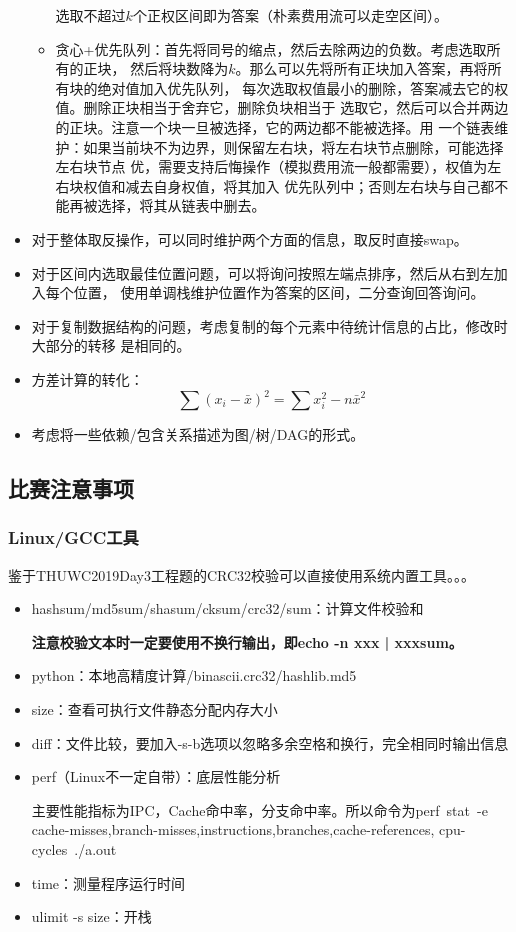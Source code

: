 \begin{itemize}
\begin{itemize}
		选取不超过$k$个正权区间即为答案（朴素费用流可以走空区间）。
		\item 贪心+优先队列：首先将同号的缩点，然后去除两边的负数。考虑选取所有的正块，
		然后将块数降为$k$。那么可以先将所有正块加入答案，再将所有块的绝对值加入优先队列，
		每次选取权值最小的删除，答案减去它的权值。删除正块相当于舍弃它，删除负块相当于
		选取它，然后可以合并两边的正块。注意一个块一旦被选择，它的两边都不能被选择。用
		一个链表维护：如果当前块不为边界，则保留左右块，将左右块节点删除，可能选择左右块节点
		优，需要支持后悔操作（模拟费用流一般都需要），权值为左右块权值和减去自身权值，将其加入
		优先队列中；否则左右块与自己都不能再被选择，将其从链表中删去。
	\end{itemize}
	\item 对于整体取反操作，可以同时维护两个方面的信息，取反时直接swap。
	\item 对于区间内选取最佳位置问题，可以将询问按照左端点排序，然后从右到左加入每个位置，
	使用单调栈维护位置作为答案的区间，二分查询回答询问。
	\item 对于复制数据结构的问题，考虑复制的每个元素中待统计信息的占比，修改时大部分的转移
	是相同的。
	\item 方差计算的转化：\begin{displaymath}
		\sum{(x_i-\bar{x})^2}=\sum{x_i^2}-n\bar{x}^2
	\end{displaymath}
	\item 考虑将一些依赖/包含关系描述为图/树/DAG的形式。
\end{itemize}
\subsection{比赛注意事项}
\subsubsection{Linux/GCC工具}
鉴于THUWC2019Day3工程题的CRC32校验可以直接使用系统内置工具。。。
\begin{itemize}
	\item hashsum/md5sum/shasum/cksum/crc32/sum：计算文件校验和

	{\bfseries 注意校验文本时一定要使用不换行输出，即echo -n xxx | xxxsum。}
	\item python：本地高精度计算/binascii.crc32/hashlib.md5
	\item size：查看可执行文件静态分配内存大小
	\item diff：文件比较，要加入-s-b选项以忽略多余空格和换行，完全相同时输出信息
	\item perf（Linux不一定自带）：底层性能分析

	主要性能指标为IPC，Cache命中率，分支命中率。所以命令为perf~stat~-e~
	cache-misses,branch-misses,instructions,branches,cache-references,
	cpu-cycles~./a.out
	\item time：测量程序运行时间
	\item ulimit -s size：开栈
\end{itemize}
